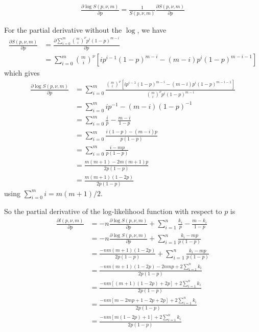 \documentclass[a4paper,12pt]{article}
\theoremstyle{definition}
\newcommand{\pdiff}[2]{\frac{\partial #1}{\partial #2}} %
\begin{document}
\begin{align}
  \pdiff{\log S(p, \nu, m)}{p} = \frac{1}{S(p, \nu, m)} \pdiff{S(p, \nu, m)}{p}
\end{align}

For the partial derivative without the $\log$, we have
\begin{align}
  \pdiff{S(p, \nu, m)}{p} &= \pdiff{\sum_{i=0}^m \binom{m}{i}^{\nu} p^i (1-p)^{m-i}}{p} \\
  & = \sum_{i=0}^m \binom{m}{i}^{\nu} \left[ i p^{i-1}(1-p)^{m-i} - (m-i)p^i(1-p)^{m-i-1} \right]
\end{align}
which gives
\begin{align}
  \pdiff{\log S(p, \nu, m)}{p} & = \sum_{i=0}^m \frac{\binom{m}{i}^{\nu} \left[ i p^{i-1}(1-p)^{m-i} - (m-i)p^i(1-p)^{m-i-1} \right]}{\binom{m}{i}^{\nu} p^{i} (1-p)^{m-i}} \\
  & = \sum_{i=0}^m i p^{-1} - (m-i) (1-p)^{-1} \\
  & = \sum_{i=0}^m \frac{i}{p} - \frac{m-i}{1-p} \\
  & = \sum_{i=0}^m \frac{i(1-p) - (m-i)p}{p(1-p)} \\
  & = \sum_{i=0}^m \frac{i - mp}{p(1-p)} \\
  & = \frac{m(m+1) -2m(m+1)p}{2p(1-p)} \\
  & = \frac{m(m+1)(1-2p)}{2p(1-p)}
\end{align}
using $\sum_{i=0}^{m} i = m(m+1)/2$.

So the partial derivative of the log-likelihood function with respect to $p$ is
\begin{align}
  \pdiff{l(p,\nu,m)}{p} & = -n \pdiff{\log S(p, \nu, m)}{p} + \sum_{i=1}^n \frac{k_i}{p} - \frac{m-k_i}{1-p} \\
  & = -n \pdiff{\log S(p, \nu, m)}{p} + \sum_{i=1}^n \frac{k_i - mp}{p(1-p)} \\
  & = \frac{-nm(m+1)(1-2p)}{2p(1-p)} + \sum_{i=1}^n \frac{k_i - mp}{p(1-p)} \\
  & = \frac{-nm(m+1)(1-2p) - 2nmp + 2\sum_{i=1}^n k_i}{2p(1-p)} \\
  & = \frac{-nm\left[ (m+1)(1-2p) + 2p \right] + 2\sum_{i=1}^n k_i}{2p(1-p)} \\
  & = \frac{-nm \left[m - 2mp + 1 -2p +2p \right] + 2 \sum_{i=1}^n k_i}{2p(1-p)} \\
  & = \frac{-nm\left[ m(1-2p) + 1\right] + 2 \sum_{i=1}^n k_i}{2p(1-p)}
\end{align}

\newpage

\end{document}

